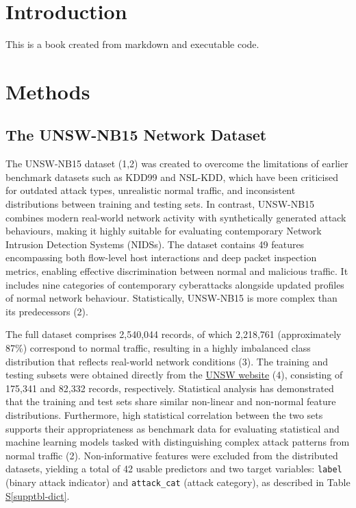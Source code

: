 \documentclass[
  a4paper,
]{scrreprt}
\newcommand*\quartosupptblref[1]{Table \hyperref[#1]{S\ref{#1}}}
\begin{document}


\chapter{Introduction}\label{introduction}

This is a book created from markdown and executable code.


\chapter{Methods}\label{methods}

\section{The UNSW-NB15 Network
Dataset}\label{the-unsw-nb15-network-dataset}

The UNSW-NB15 dataset (1,2) was created to overcome the limitations of
earlier benchmark datasets such as KDD99 and NSL-KDD, which have been
criticised for outdated attack types, unrealistic normal traffic, and
inconsistent distributions between training and testing sets. In
contrast, UNSW-NB15 combines modern real-world network activity with
synthetically generated attack behaviours, making it highly suitable for
evaluating contemporary Network Intrusion Detection Systems (NIDSs). The
dataset contains 49 features encompassing both flow-level host
interactions and deep packet inspection metrics, enabling effective
discrimination between normal and malicious traffic. It includes nine
categories of contemporary cyberattacks alongside updated profiles of
normal network behaviour. Statistically, UNSW-NB15 is more complex than
its predecessors (2).

The full dataset comprises 2,540,044 records, of which 2,218,761
(approximately 87\%) correspond to normal traffic, resulting in a highly
imbalanced class distribution that reflects real-world network
conditions (3). The training and testing subsets were obtained directly
from the
\href{https://research.unsw.edu.au/projects/unsw-nb15-dataset}{UNSW
website} (4), consisting of 175,341 and 82,332 records, respectively.
Statistical analysis has demonstrated that the training and test sets
share similar non-linear and non-normal feature distributions.
Furthermore, high statistical correlation between the two sets supports
their appropriateness as benchmark data for evaluating statistical and
machine learning models tasked with distinguishing complex attack
patterns from normal traffic (2). Non-informative features were excluded
from the distributed datasets, yielding a total of 42 usable predictors
and two target variables: \texttt{label} (binary attack indicator) and
\texttt{attack\_cat} (attack category), as described in
\quartosupptblref{supptbl-dict}.
\end{document}
